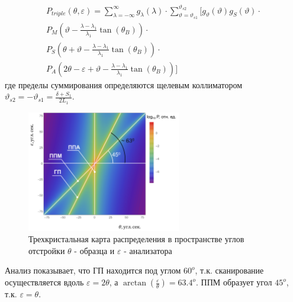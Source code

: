 \begin{eqnarray} \label{eq:doudle_spectra_angle}
  P_{triple}(\theta,\varepsilon) = \sum_{\lambda = -\infty}^{\infty}g_{\lambda}(\lambda)\cdot
  \sum_{\vartheta = \vartheta_{s1}}^{\vartheta_{s2}} \Bigg[ g_{\vartheta}(\vartheta) g_{S}(\vartheta) \cdot \nonumber \\
    P_M \left(\vartheta - \frac{\lambda - \lambda_1}{\lambda_1}\tan(\theta_B) \right) \cdot \nonumber \\
   P_S \left(\theta + \vartheta - \frac{\lambda - \lambda_1}{\lambda_1}\tan(\theta_B)\right)  \cdot  \nonumber \\
   P_A \left(2\theta - \varepsilon + \vartheta - \frac{\lambda - \lambda_1}{\lambda_1}\tan(\theta_B)\right) \Bigg]
 \end{eqnarray}
 \noindent
где пределы суммирования определяются щелевым коллиматором $\vartheta_{s2} = - \vartheta_{s1} = \frac{\delta+S_1}{2L_1}$.
 \begin{figure}[H]
   \centering
   \includegraphics[width=0.6\textwidth]{images/triple_map_direct_space.png}
   \caption{Трехкристальная карта распределения в пространстве углов отстройки $\theta$ - образца и $\varepsilon$
   -  анализатора}
   \label{ris:triple_map_direct_space}
 \end{figure}

Анализ показывает, что ГП находится под углом $60^o$, т.к. сканирование осуществляется вдоль $\varepsilon = 2 \theta$,
а $ \arctan \left(\frac{\varepsilon}{\theta} \right) = 63.4^o$. ППМ образует угол $45^o$, т.к. $\varepsilon = \theta$.
